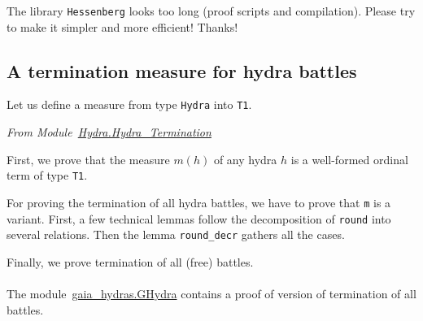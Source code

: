 
    \begin{project}
    The library \texttt{Hessenberg} looks too long (proof scripts and compilation).
    Please try to make it simpler and more efficient!
    Thanks!
    \end{project}

    \subsection{A termination measure for hydra battles }

    \label{sec:hydra-measure}

    Let us define a measure from type \texttt{Hydra} into \texttt{T1}.


    \vspace{4pt}
    \emph{From Module~\href{../theories/html/hydras.Hydra.Hydra_Termination.html\#m}{Hydra.Hydra\_Termination}}

   



    First, we prove that the measure $m(h)$  of any hydra $h$ is a well-formed ordinal term of type \texttt{T1}.

    
      
   
    For proving the termination of all hydra battles, we have to prove that
    \texttt{m} is a variant. First, a few technical lemmas follow the decomposition of \texttt{round} into several relations. Then the lemma \texttt{round\_decr} gathers all the cases.

    \label{sect:variant-decr}

    
    
    
    
     
 
      Finally, we prove termination of all (free) battles.

    \label{thm:every-battle-terminates}

    

    \paragraph*{\gaiasign}
    The module~\href{../theories/html/gaia_hydras.GHydra.html}{gaia\_hydras.GHydra} contains a proof of \gaiaHydras version of termination of all battles.


